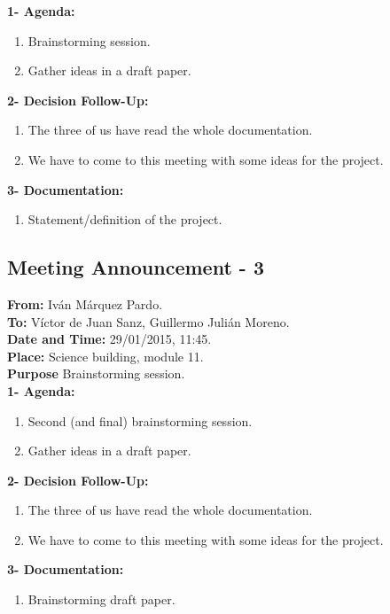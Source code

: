 \textbf{1- Agenda:}
\begin{enumerate}
\item Brainstorming session.
\item Gather ideas in a draft paper.
\end{enumerate}
\textbf{2- Decision Follow-Up:} 
\begin{enumerate}
\item The three of us have read the whole documentation.
\item We have to come to this meeting with some ideas for the project.
\end{enumerate}
\textbf{3- Documentation:}
\begin{enumerate}
\item Statement/definition of the project.
\end{enumerate}


\subsection{Meeting Announcement - 3}

\textbf{From: } Iván Márquez Pardo.\\
\textbf{To: } Víctor de Juan Sanz, Guillermo Julián Moreno.\\

\textbf{Date and Time: } 29/01/2015, 11:45.\\
\textbf{Place: } Science building, module 11.\\

\textbf{Purpose} Brainstorming session.\\

\textbf{1- Agenda:}
\begin{enumerate}
\item Second (and final) brainstorming session.
\item Gather ideas in a draft paper.
\end{enumerate}
\textbf{2- Decision Follow-Up:} 
\begin{enumerate}
\item The three of us have read the whole documentation.
\item We have to come to this meeting with some ideas for the project.
\end{enumerate}
\textbf{3- Documentation:}
\begin{enumerate}
\item Brainstorming draft paper.
\end{enumerate}


